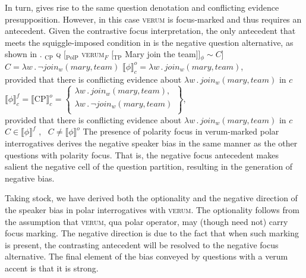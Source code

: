 \documentclass[output=paper,colorlinks,citecolor=brown]{langscibook}
\begin{document}
In turn,  gives rise to the same question denotation and conflicting evidence presupposition. However, in this case \textsc{verum} is focus-marked and thus requires an antecedent. Given the contrastive focus interpretation, the only antecedent that meets the squiggle-imposed condition in  is the negative question alternative, as shown in .
\is{}	
\ea \label{Vrm.LF2.Der}
	\ea {[}$_{\text{CP}}$ \textsc{q} [$_{\text{PolP}}$ \textsc{verum}$_F$ [$_{\text{TP}}$ Mary join the team]]$_{\phi} \sim C$] 
	\ex $C = \lambda w \, . \,\neg join_w(mary,team)$ 
	\ex $\llbracket \phi \rrbracket^{o}_{c} = \lambda w \, . \, join_w(mary,team) $, \\
	provided that there is conflicting evidence about $\lambda w \, . \, join_w(mary,team)$ in $c$  
	\ex $\llbracket \phi \rrbracket^{f}_c = \llbracket \text{CP} \rrbracket^{o}_c = \left\{ \begin{array}{l}
		\lambda w \, . \, join_w(mary,team), 	\\ 
		\lambda w \, . \,\neg join_w(mary,team) \\ 
	\end{array} \right\} $, 				\\ 
	provided that there is conflicting evidence about $\lambda w \, . \, join_w(mary,team)$ in $c$
	\ex $C \in  \llbracket \phi \rrbracket ^f$ \cmark, \, $C \ne \llbracket \phi  \rrbracket ^o$ \cmark
	\z
\z
\il{}
The presence of polarity focus in verum-marked polar interrogatives derives the negative speaker bias in the same manner as the other questions with polarity focus. That is, the negative focus antecedent makes salient the negative cell of the question partition, resulting in the generation of negative bias.  
	
Taking stock, we have derived both the optionality and the negative direction of the speaker bias in polar interrogatives with \textsc{verum}. The optionality follows from the assumption that \textsc{verum}, qua polar operator, may (though need not) carry focus marking. The negative direction is due to the fact that when such marking is present, the contrasting antecedent will be resolved to the negative focus alternative. The final element of the bias conveyed by questions with a verum accent is that it is strong. 
\end{document}
